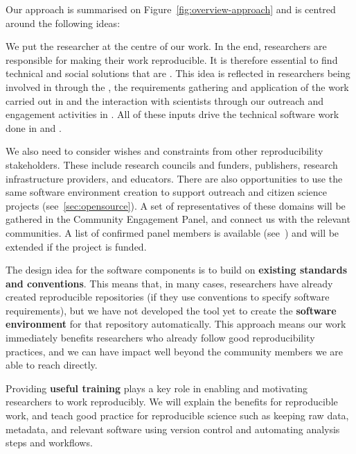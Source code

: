 Our approach is summarised on Figure~\ref{fig:overview-approach} and is centred around the following ideas:
\begin{compactenum}
  \item We put the researcher at the centre of our work. In the end,
    researchers are responsible for making their work
    reproducible. It is therefore essential to find technical and social solutions
    that are . This idea is reflected in researchers
    being involved in  through the , the requirements gathering and application of the work carried out
  in  and the interaction with scientists through our
  outreach and engagement activities in . All of these inputs
  drive the technical software work done in  and .
\item We also need to consider wishes and constraints from other reproducibility
  stakeholders. These include research councils and funders, publishers, research
  infrastructure providers, and educators. There are also opportunities to use the same
  software environment creation to support outreach and
  citizen science projects (see~\ref{sec:opensource}). A set of representatives of
  these domains will be gathered in the Community Engagement Panel, and connect
  us with the relevant communities. A list of confirmed panel members is
  available (see~) and will be
  extended if the project is funded.
\item The design idea for the software components is to build on \textbf{existing standards and
  conventions}. This means that, in many cases, researchers have already created reproducible
  repositories (if they use conventions to specify software requirements),
  but we have not developed the tool yet to create the \textbf{software environment} for that
  repository automatically.
  This approach means our work immediately benefits researchers who already follow good reproducibility practices,
  and we can have impact well beyond the community members we are able to reach directly.
\item Providing \textbf{useful training} plays a key role in enabling and motivating
  researchers to work reproducibly. We will explain the benefits for
  reproducible work, and teach good practice for reproducible science such as
  keeping raw data, metadata, and relevant software using version control and
  automating analysis steps and workflows.

\end{compactenum}

